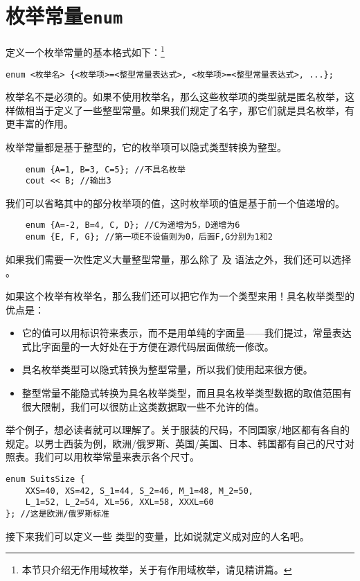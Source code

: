 \section{枚举常量\texttt{enum}}
定义一个枚举常量的基本格式如下：\footnote{本节只介绍无作用域枚举，关于有作用域枚举，请见精讲篇。}
\begin{lstlisting}
enum <枚举名> {<枚举项>=<整型常量表达式>, <枚举项>=<整型常量表达式>, ...};
\end{lstlisting}\par
枚举名不是必须的。如果不使用枚举名，那么这些枚举项的类型就是匿名枚举，这样做相当于定义了一些整型常量。如果我们规定了名字，那它们就是具名枚举，有更丰富的作用。\par
枚举常量都是基于整型的，它的枚举项可以隐式类型转换为整型。
\begin{lstlisting}
    enum {A=1, B=3, C=5}; //不具名枚举
    cout << B; //输出3
\end{lstlisting}
我们可以省略其中的部分枚举项的值，这时枚举项的值是基于前一个值递增的。
\begin{lstlisting}
    enum {A=-2, B=4, C, D}; //C为递增为5，D递增为6
    enum {E, F, G}; //第一项E不设值则为0，后面F,G分别为1和2
\end{lstlisting}
如果我们需要一次性定义大量整型常量，那么除了 \lstinline@const@ 及 \lstinline@constexpr@ 语法之外，我们还可以选择 \lstinline@enum@。\par
如果这个枚举有枚举名，那么我们还可以把它作为一个类型来用！具名枚举类型的优点是：
\begin{itemize}
    \item 它的值可以用标识符来表示，而不是用单纯的字面量——我们提过，常量表达式比字面量的一大好处在于方便在源代码层面做统一修改。
    \item 具名枚举类型可以隐式转换为整型常量，所以我们使用起来很方便。
    \item 整型常量不能隐式转换为具名枚举类型，而且具名枚举类型数据的取值范围有很大限制，我们可以很防止这类数据取一些不允许的值。
\end{itemize}
举个例子，想必读者就可以理解了。关于服装的尺码，不同国家/地区都有各自的规定。以男士西装为例，欧洲/俄罗斯、英国/美国、日本、韩国都有自己的尺寸对照表。我们可以用枚举常量来表示各个尺寸。
\begin{lstlisting}
enum SuitsSize {
    XXS=40, XS=42, S_1=44, S_2=46, M_1=48, M_2=50,
    L_1=52, L_2=54, XL=56, XXL=58, XXXL=60
}; //这是欧洲/俄罗斯标准
\end{lstlisting}
接下来我们可以定义一些 \lstinline@SuitsSize@ 类型的变量，比如说就定义成对应的人名吧。
